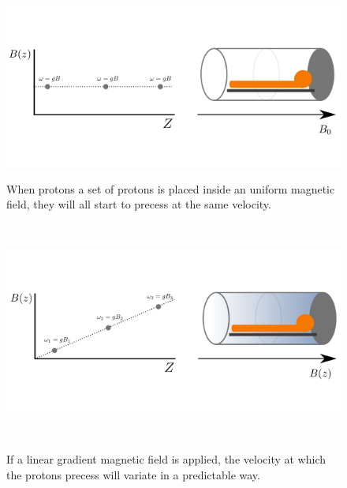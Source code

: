 \begin{figure}[h!]
\begin{minipage}[b]{0.49\textwidth}
    \includegraphics[width=\textwidth]{3.mri/img/grad0.png}
    \caption{\small  When protons a set of protons is placed inside an uniform magnetic field, they will all start to precess at the same velocity.}
     \label{fig:unif}
\end{minipage} ~
\hfill
\begin{minipage}[b]{0.49\textwidth}
    \includegraphics[width=\textwidth]{3.mri/img/grad1.png}
    \caption{\small If a linear gradient magnetic field is applied, the velocity at which the protons precess will variate in a predictable way.}
    \label{fig:grad}
\end{minipage} ~

\end{figure}

